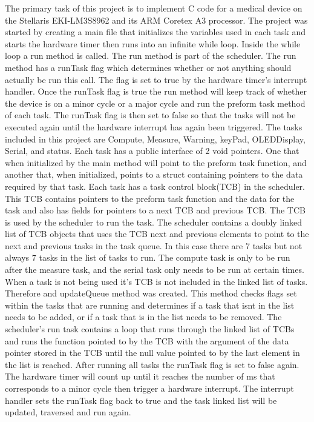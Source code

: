 \documentclass[12pt]{article} %
\begin{document}
    The primary task of this project is to implement C code for a medical
    device on the Stellaris EKI-LM3S8962 and its ARM Coretex A3 processor. The
    project was started by creating a main file that initializes the variables
    used in each task and starts the hardware timer then runs into an infinite
    while loop. Inside the while loop a run method is called. The run method is
    part of the scheduler. The run method has a runTask flag which determines
    whether or not anything should actually be run this call. The flag is set
    to true by the hardware timer's interrupt handler. Once the runTask flag is
    true the run method will keep track of whether the device is on a minor
    cycle or a major cycle and run the preform task method of each task. The
    runTask flag is then set to false so that the tasks will not be executed
    again until the hardware interrupt has again been triggered. The tasks
    included in this project are Compute, Measure, Warning, keyPad,
    OLEDDisplay, Serial, and status. Each task has a public interface of 2 void
    pointers. One that when initialized by the main method will point to the
    preform task function, and another that, when initialized, points to a
    struct containing pointers to the data required by that task. Each task has
    a task control block(TCB) in the scheduler. This TCB contains pointers to
    the preform task function and the data for the task and also has fields for
    pointers to a next TCB and previous TCB. The TCB is used by the scheduler
    to run the task. The scheduler contains a doubly linked list of TCB objects
    that uses the TCB next and previous elements to point to the next and
    previous tasks in the task queue. In this case there are 7 tasks but not
    always 7 tasks in the list of tasks to run. The compute task is only to be
    run after the measure task, and the serial task only needs to be run at
    certain times. When a task is not being used it's TCB is not included in
    the linked list of tasks. Therefore and updateQueue method was created.
    This method checks flags set within the tasks that are running and
    determines if a task that isnt in the list needs to be added, or if a task
    that is in the list needs to be removed. The scheduler's run task contains
    a loop that runs through the linked list of TCBs and runs the function
    pointed to by the TCB with the argument of the data pointer stored in the
    TCB until the null value pointed to by the last element in the list is
    reached. After running all  tasks the runTask flag is set to false again.
    The hardware timer will count up until it reaches the number of ms that
    corresponds to a minor cycle then trigger a hardware interrupt. The
    interrupt handler sets the runTask flag back to true and the task linked
    list will be updated, traversed and run again.
    
\end{document}
